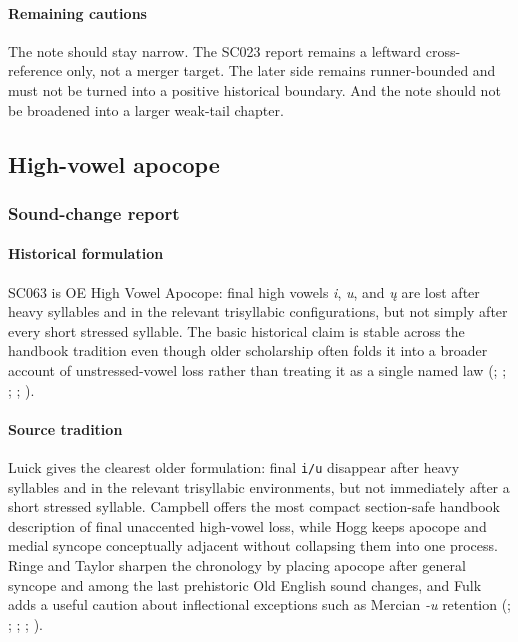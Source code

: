 \documentclass[
  british,
  a4paper,
]{article}
\begin{document}
\paragraph{Remaining cautions}\label{remaining-cautions-39}

The note should stay narrow. The SC023 report remains a leftward
cross-reference only, not a merger target. The later side remains
runner-bounded and must not be turned into a positive historical
boundary. And the note should not be broadened into a larger weak-tail
chapter.

\subsection{High-vowel apocope}\label{high-vowel-apocope}

\subsubsection{Sound-change report}\label{sound-change-report-40}

\paragraph{Historical formulation}\label{historical-formulation-40}

SC063 is OE High Vowel Apocope: final high vowels \emph{i}, \emph{u},
and \emph{ų} are lost after heavy syllables and in the relevant
trisyllabic configurations, but not simply after every short stressed
syllable. The basic historical claim is stable across the handbook
tradition even though older scholarship often folds it into a broader
account of unstressed-vowel loss rather than treating it as a single
named law (;
;
;
; ).

\paragraph{Source tradition}\label{source-tradition-40}

Luick gives the clearest older formulation: final \texttt{i/u} disappear
after heavy syllables and in the relevant trisyllabic environments, but
not immediately after a short stressed syllable. Campbell offers the
most compact section-safe handbook description of final unaccented
high-vowel loss, while Hogg keeps apocope and medial syncope
conceptually adjacent without collapsing them into one process. Ringe
and Taylor sharpen the chronology by placing apocope after general
syncope and among the last prehistoric Old English sound changes, and
Fulk adds a useful caution about inflectional exceptions such as Mercian
\emph{-u} retention (; ;
;
; ).
\end{document}
